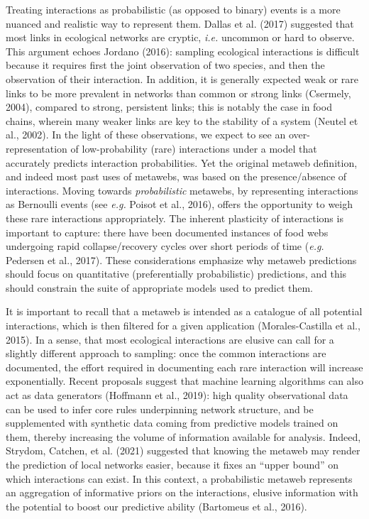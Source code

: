\documentclass[10pt,oneside]{article}
\begin{document}
Treating interactions as probabilistic (as opposed to binary) events is
a more nuanced and realistic way to represent them. Dallas et al. (2017)
suggested that most links in ecological networks are cryptic,
\emph{i.e.} uncommon or hard to observe. This argument echoes Jordano
(2016): sampling ecological interactions is difficult because it
requires first the joint observation of two species, and then the
observation of their interaction. In addition, it is generally expected
weak or rare links to be more prevalent in networks than common or
strong links (Csermely, 2004), compared to strong, persistent links;
this is notably the case in food chains, wherein many weaker links are
key to the stability of a system (Neutel et al., 2002). In the light of
these observations, we expect to see an over-representation of
low-probability (rare) interactions under a model that accurately
predicts interaction probabilities. Yet the original metaweb definition,
and indeed most past uses of metawebs, was based on the presence/absence
of interactions. Moving towards \emph{probabilistic} metawebs, by
representing interactions as Bernoulli events (see \emph{e.g.} Poisot et
al., 2016), offers the opportunity to weigh these rare interactions
appropriately. The inherent plasticity of interactions is important to
capture: there have been documented instances of food webs undergoing
rapid collapse/recovery cycles over short periods of time (\emph{e.g.}
Pedersen et al., 2017). These considerations emphasize why metaweb
predictions should focus on quantitative (preferentially probabilistic)
predictions, and this should constrain the suite of appropriate models
used to predict them.

It is important to recall that a metaweb is intended as a catalogue of
all potential interactions, which is then filtered for a given
application (Morales-Castilla et al., 2015). In a sense, that most
ecological interactions are elusive can call for a slightly different
approach to sampling: once the common interactions are documented, the
effort required in documenting each rare interaction will increase
exponentially. Recent proposals suggest that machine learning algorithms
can also act as data generators (Hoffmann et al., 2019): high quality
observational data can be used to infer core rules underpinning network
structure, and be supplemented with synthetic data coming from
predictive models trained on them, thereby increasing the volume of
information available for analysis. Indeed, Strydom, Catchen, et al.
(2021) suggested that knowing the metaweb may render the prediction of
local networks easier, because it fixes an ``upper bound'' on which
interactions can exist. In this context, a probabilistic metaweb
represents an aggregation of informative priors on the interactions,
elusive information with the potential to boost our predictive ability
(Bartomeus et al., 2016).
\end{document}
